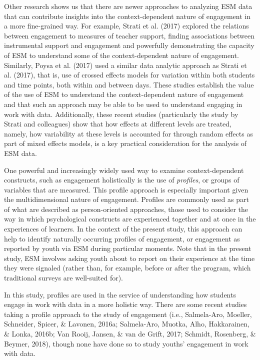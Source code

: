 \documentclass[]{book}
\theoremstyle{definition}
\theoremstyle{definition}
\theoremstyle{definition}
\theoremstyle{remark}
\begin{document}
Other research shows us that there are newer approaches to analyzing ESM
data that can contribute insights into the context-dependent nature of
engagement in a more fine-grained way. For example, Strati et al. (2017)
explored the relations between engagement to measures of teacher
support, finding associations between instrumental support and
engagement and powerfully demonstrating the capacity of ESM to
understand some of the context-dependent nature of engagement.
Similarly, Poysa et al. (2017) used a similar data analytic approach as
Strati et al. (2017), that is, use of crossed effects models for
variation within both students and time points, both within and between
days. These studies establish the value of the use of ESM to understand
the context-dependent nature of engagement and that such an approach may
be able to be used to understand engaging in work with data.
Additionally, these recent studies (particularly the study by Strati and
colleagues) show that how effects at different levels are treated,
namely, how variability at these levels is accounted for through random
effects as part of mixed effects models, is a key practical
consideration for the analysis of ESM data.

One powerful and increasingly widely used way to examine
context-dependent constructs, such as engagement holistically is the use
of \emph{profiles}, or groups of variables that are measured. This
profile approach is especially important given the multidimensional
nature of engagement. Profiles are commonly used as part of what are
described as person-oriented approaches, those used to consider the way
in which psychological constructs are experienced together and at once
in the experiences of learners. In the context of the present study,
this approach can help to identify naturally occurring profiles of
engagement, or engagement as reported by youth via ESM during particular
moments. Note that in the present study, ESM involves asking youth about
to report on their experience at the time they were signaled (rather
than, for example, before or after the program, which traditional
surveys are well-suited for).

In this study, profiles are used in the service of understanding how
students engage in work with data in a more holistic way. There are some
recent studies taking a profile approach to the study of engagement
(i.e., Salmela-Aro, Moeller, Schneider, Spicer, \& Lavonen, 2016a;
Salmela-Aro, Muotka, Alho, Hakkarainen, \& Lonka, 2016b; Van Rooij,
Jansen, \& van de Grift, 2017; Schmidt, Rosenberg, \& Beymer, 2018),
though none have done so to study youths' engagement in work with data.
\end{document}

